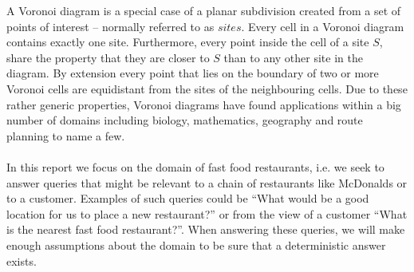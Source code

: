 A Voronoi diagram is a special case of a planar subdivision created from a set of points of interest – normally referred to as $sites$. Every cell in a Voronoi diagram contains exactly one site. Furthermore, every point inside the cell of a site $S$, share the property that they are closer to $S$ than to any other site in the diagram. By extension every point that lies on the boundary of two or more Voronoi cells are equidistant from the sites of the neighbouring cells. Due to these rather generic properties, Voronoi diagrams have found applications within a big number of domains including biology, mathematics, geography and route planning to name a few.\cite{voronoi_applications} \paragraph{}
In this report we focus on the domain of fast food restaurants, i.e. we seek to answer queries that might be relevant to a chain of restaurants like McDonalds or to a customer. Examples of such queries could be “What would be a good location for us to place a new restaurant?” or from the view of a customer “What is the nearest fast food restaurant?”. When answering these queries, we will make enough assumptions about the domain to be sure that a deterministic answer exists.